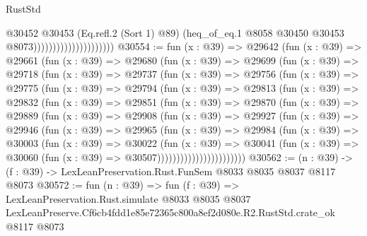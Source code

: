 \begin{lexlean}{RustStd}
\begin{coremodule}
                                          @30452
                                            @30453
                                            (Eq.refl.{2} (Sort 1) @89)
                                            (heq_of_eq.{1}
                                              @8058
                                              @30450
                                              @30453
                                              @8073)))))))))))))))))))))
@30554 := fun (x : @39) =>
  @29642
    (fun (x : @39) =>
    @29661
      (fun (x : @39) =>
      @29680
        (fun (x : @39) =>
        @29699
          (fun (x : @39) =>
          @29718
            (fun (x : @39) =>
            @29737
              (fun (x : @39) =>
              @29756
                (fun (x : @39) =>
                @29775
                  (fun (x : @39) =>
                  @29794
                    (fun (x : @39) =>
                    @29813
                      (fun (x : @39) =>
                      @29832
                        (fun (x : @39) =>
                        @29851
                          (fun (x : @39) =>
                          @29870
                            (fun (x : @39) =>
                            @29889
                              (fun (x : @39) =>
                              @29908
                                (fun (x : @39) =>
                                @29927
                                  (fun (x : @39) =>
                                  @29946
                                    (fun (x : @39) =>
                                    @29965
                                      (fun (x : @39) =>
                                      @29984
                                        (fun (x : @39) =>
                                        @30003
                                          (fun (x : @39) =>
                                          @30022
                                            (fun (x : @39) =>
                                            @30041
                                              (fun (x : @39) =>
                                              @30060 (fun (x : @39) => @30507)))))))))))))))))))))))
@30562 := (n : @39) -> (f : @39) -> LexLeanPreservation.Rust.FunSem @8033 @8035 @8037 @8117 @8073
@30572 := fun (n : @39) =>
  fun (f : @39) =>
  LexLeanPreservation.Rust.simulate
    @8033
    @8035
    @8037
    LexLeanPreserve.Cf6cb4fdd1e85e72365c800a8ef2d080e.R2.RustStd.crate_ok
    @8117
    @8073
\end{coremodule}
\end{lexlean}
